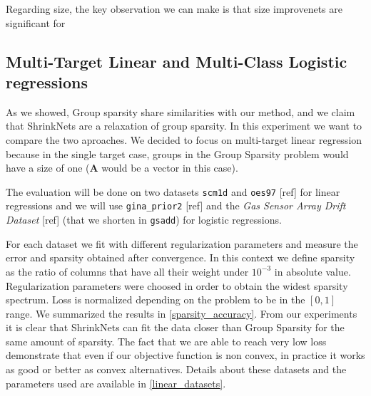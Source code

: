 Regarding size, the key observation we can make is that size improvenets are
significant for 




\subsection{Multi-Target Linear and Multi-Class Logistic regressions}

As we showed, Group sparsity share similarities with our method, and we claim
that ShrinkNets are a relaxation of group sparsity.  In this experiment we want
to compare the two aproaches.  We decided to focus on multi-target linear
regression because in the single target case, groups in the Group Sparsity
problem would have a size of one ($\bm{A}$ would be a vector in this case).

The evaluation will be done on two datasets \texttt{scm1d} and \texttt{oes97}
[ref] for linear regressions and we will use \texttt{gina\_prior2} [ref] and
the \textit{Gas Sensor Array Drift Dataset} [ref] (that we shorten in
\texttt{gsadd}) for logistic regressions.

For each dataset we fit with different regularization parameters and measure
the error and sparsity obtained after convergence. In this context we define
sparsity as the ratio of columns that have all their weight under $10^{-3}$ in
absolute value. Regularization parameters were choosed in order to obtain the
widest sparsity spectrum. Loss is normalized depending on the problem to be in
the $[0, 1]$ range. We summarized the results in \cref{sparsity_accuracy}. From
our experiments it is clear that ShrinkNets can fit the data closer than Group
Sparsity for the same amount of sparsity. The fact that we are able to reach
very low loss demonstrate that even if our objective function is non convex, in
practice it works as good or better as convex alternatives. Details about these
datasets and the parameters used are available in \cref{linear_datasets}.

